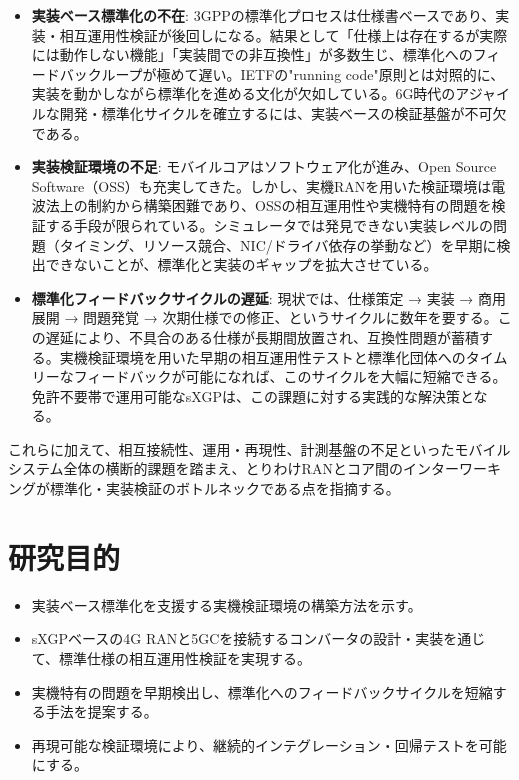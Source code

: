 \begin{itemize}
	\item \textbf{実装ベース標準化の不在}: 3GPPの標準化プロセスは仕様書ベースであり、実装・相互運用性検証が後回しになる。結果として「仕様上は存在するが実際には動作しない機能」「実装間での非互換性」が多数生じ、標準化へのフィードバックループが極めて遅い。IETFの"running code"原則とは対照的に、実装を動かしながら標準化を進める文化が欠如している。6G時代のアジャイルな開発・標準化サイクルを確立するには、実装ベースの検証基盤が不可欠である。

	\item \textbf{実装検証環境の不足}: モバイルコアはソフトウェア化が進み、Open Source Software（OSS）も充実してきた。しかし、実機RANを用いた検証環境は電波法上の制約から構築困難であり、OSSの相互運用性や実機特有の問題を検証する手段が限られている。シミュレータでは発見できない実装レベルの問題（タイミング、リソース競合、NIC/ドライバ依存の挙動など）を早期に検出できないことが、標準化と実装のギャップを拡大させている。

	\item \textbf{標準化フィードバックサイクルの遅延}: 現状では、仕様策定 → 実装 → 商用展開 → 問題発覚 → 次期仕様での修正、というサイクルに数年を要する。この遅延により、不具合のある仕様が長期間放置され、互換性問題が蓄積する。実機検証環境を用いた早期の相互運用性テストと標準化団体へのタイムリーなフィードバックが可能になれば、このサイクルを大幅に短縮できる。免許不要帯で運用可能なsXGPは、この課題に対する実践的な解決策となる。
\end{itemize}

これらに加えて、相互接続性、運用・再現性、計測基盤の不足といったモバイルシステム全体の横断的課題を踏まえ、とりわけRANとコア間のインターワーキングが標準化・実装検証のボトルネックである点を指摘する。

\section{研究目的}
\begin{itemize}
	\item 実装ベース標準化を支援する実機検証環境の構築方法を示す。
	\item sXGPベースの4G RANと5GCを接続するコンバータの設計・実装を通じて、標準仕様の相互運用性検証を実現する。
	\item 実機特有の問題を早期検出し、標準化へのフィードバックサイクルを短縮する手法を提案する。
	\item 再現可能な検証環境により、継続的インテグレーション・回帰テストを可能にする。
\end{itemize}

